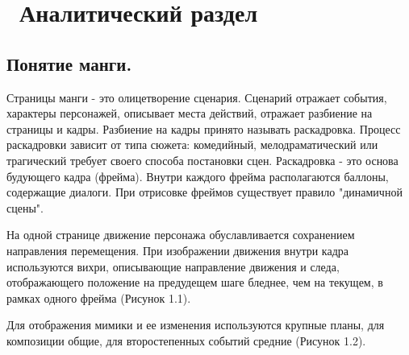\chapter{ Аналитический раздел}
\label{cha:analysis}


\section {Понятие манги.}

Страницы манги - это олицетворение сценария. Сценарий отражает события,
характеры персонажей, описывает места действий, отражает разбиение на страницы
и кадры. Разбиение на кадры принято называть раскадровка. Процесс раскадровки
зависит от типа сюжета: комедийный, мелодраматический или трагический требует
своего способа постановки сцен. Раскадровка - это основа будующего кадра (фрейма).
Внутри каждого фрейма располагаются баллоны, содержащие диалоги. При
отрисовке фреймов существует правило "динамичной сцены". 

На одной странице движение персонажа обуславливается сохранением направления перемещения. При
изображении движения внутри кадра используются вихри, описывающие направление
движения и следа, отображающего положение на предудещем шаге бледнее, чем
на текущем, в рамках одного фрейма (Рисунок 1.1).

\begin{figure}[ht!]
\end{figure}


 Для отображения мимики и ее изменения используются
крупные планы, для композиции общие, для второстепенных событий
средние (Рисунок 1.2). 


\begin{figure}[ht!]
\end{figure}

